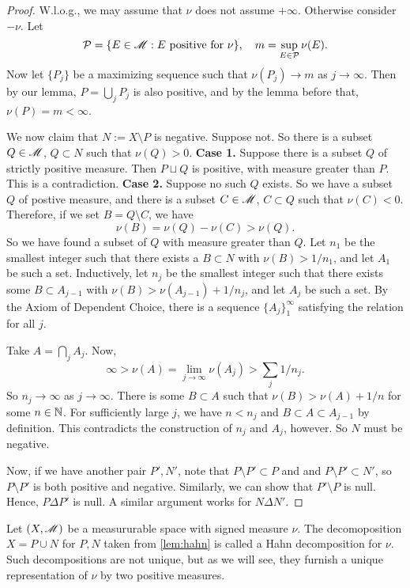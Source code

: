 \documentclass[12pt]{article} %
\begin{document}
\begin{proof}
    W.l.o.g., we may assume that $\nu$ does not assume $+\infty$. Otherwise consider $-\nu$. Let \[\mathcal{P} = \{E \in \mathscr{M} : E \ \text{positive for} \ \nu\}, \ \ \ m = \sup_{E \in \mathcal{P}} \nu(E).\] Now let $\{P_j\}$ be a maximizing sequence such that $\nu(P_j) \to m$ as $j \to \infty$. Then by our lemma, $P = \bigcup_j P_j$ is also positive, and by the lemma before that, $\nu(P) = m < \infty$.

    We now claim that $N := X \setminus P$ is negative. Suppose not. So there is a subset $Q \in \mathscr{M}$, $Q \subset N$ such that $\nu(Q) > 0$. \textbf{Case 1.} Suppose there is a subset $Q$ of strictly positive measure. Then $P \sqcup Q$ is positive, with measure greater than $P$. This is a contradiction. \textbf{Case 2.} Suppose no such $Q$ exists. So we have a subset $Q$ of postive measure, and there is a subset $C \in \mathscr{M}$, $C \subset Q$ such that $\nu(C) < 0$. Therefore, if we set $B = Q \setminus C$, we have \[\nu(B) = \nu(Q) - \nu(C) > \nu(Q).\] So we have found a subset of $Q$ with measure greater than $Q$. Let $n_1$ be the smallest integer such that there exists a $B \subset N$ with $\nu(B) >
    1/n_1$, and let $A_1$ be such a set. Inductively, let $n_j$ be the smallest integer such that there exists some $B \subset A_{j-1}$ with $\nu(B) > \nu(A_{j-1}) + 1/n_j$, and let $A_j$ be such a set. By the Axiom of Dependent Choice, there is a sequence $\{A_j\}_1^\infty$ satisfying the relation for all $j$.

    Take $A = \bigcap_j A_j$. Now, \[\infty > \nu(A) = \lim_{j \to \infty} \nu(A_j) > \sum_j 1/n_j.\] So $n_j \to \infty$ as $j \to \infty$. There is some $B \subset A$ such that $\nu(B) > \nu(A) + 1/n$ for some $n \in \mathbb{N}$. For sufficiently large $j$, we have $n < n_j$ and $B \subset A \subset A_{j-1}$ by definition. This contradicts the construction of $n_j$ and $A_j$, however. So $N$ must be negative.

    Now, if we have another pair $P', N'$, note that $P \setminus P' \subset P$ and and $P \setminus P' \subset N'$, so $P \setminus P'$ is both positive and negative. Similarly, we can show that $P' \setminus P$ is null. Hence, $P \Delta P'$ is null. A similar argument works for $N \Delta N'$.
\end{proof}

\begin{definition}
    Let $(X, \mathscr{M})$ be a measururable space with signed measure $\nu$.
    The decomoposition $X = P \cup N$ for $P, N$ taken from \cref{lem:hahn} is called a Hahn decomposition for $\nu$. Such decompositions are not unique, but as we will see, they furnish a unique representation of $\nu$ by two positive measures.
\end{definition}
\end{document}
